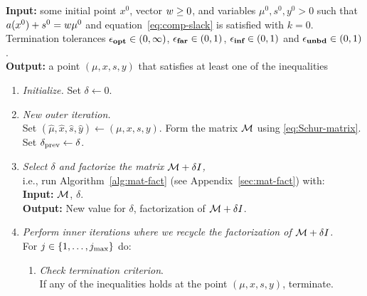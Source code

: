 \documentclass{article}
\begin{document}
\begin{algorithm}[H]
\textbf{Input:} some initial point $x^{0}$, vector $w \ge 0$, and variables $\mu^0, s^{0}, y^{0} > 0$  such that $a(x^{0}) + s^{0} = w \mu^{0}$ and equation~\eqref{eq:comp-slack}   is satisfied with $k=0$. Termination tolerances $\epsilon_{\textbf{opt}} \in (0,\infty)$, $\epsilon_{\textbf{far}} \in (0,1)$, $\epsilon_{\textbf{inf}} \in (0,1)$ and $\epsilon_{\textbf{unbd}} \in (0,1)$. \\
\textbf{Output:} a point $(\mu, x, s, y)$ that satisfies at least one of the inequalities \termination{}
\vspace{0.1 cm} %
\begin{enumerate}[label*=A.{\arabic*}]
\item \emph{Initialize.} Set $\delta \gets 0$.
\item \label{line:form-K}  \emph{New outer iteration.} \\
Set $(\hat{\mu}, \hat{x}, \hat{s}, \hat{y}) \gets (\mu, x, s, y)$. Form the matrix $\mathcal{M}$ using \eqref{eq:Schur-matrix}. Set $\delta_{\text{prev}} \gets \delta$.
\item \emph{Select $\delta$ and factorize the matrix $\mathcal{M} + \delta I$,} \\
i.e., run Algorithm~\ref{alg:mat-fact} (see Appendix~\ref{sec:mat-fact}) with: \\
\hspace*{0.1cm}  \textbf{Input:} $\mathcal{M}$, $\delta$. \\
\hspace*{0.1cm} \textbf{Output:} New value for $\delta$, factorization of $\mathcal{M} + \delta I$.
\item \label{take-steps}  \emph{Perform inner iterations where we recycle the factorization of $\mathcal{M} + \delta I$.} \\
For $j \in \{ 1, \dots , j_{\max} \}$ do:
\begin{enumerate}[label*=.{\arabic*}]
\item \emph{Check termination criterion}. \\
If any of the inequalities \termination{} holds at the point $(\mu,x,s,y)$, terminate.

\end{enumerate}
\end{enumerate}
\end{algorithm}
\end{document}
